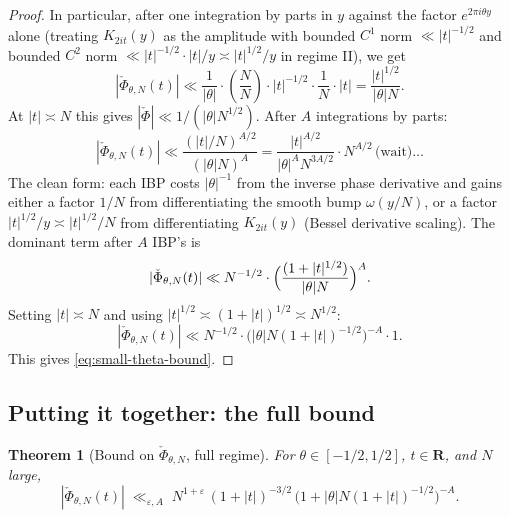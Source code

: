 \documentclass[11pt]{article}
\newtheorem{theorem}{Theorem}[section]
\theoremstyle{definition}
\newcommand{\R}{\mathbf{R}}
\begin{document}
\begin{proof}
In particular, after one integration by parts in $y$ against the factor $e^{2\pi i\theta y}$ alone (treating $K_{2it}(y)$ as the amplitude with bounded $C^1$ norm $\ll |t|^{-1/2}$ and bounded $C^2$ norm $\ll |t|^{-1/2}\cdot|t|/y \asymp |t|^{1/2}/y$ in regime II), we get
\[
    |\check\Phi_{\theta,N}(t)| \ll \frac{1}{|\theta|}\cdot\left(\frac{N}{N}\right)\cdot|t|^{-1/2}\cdot\frac{1}{N} \cdot |t| = \frac{|t|^{1/2}}{|\theta|N}.
\]
At $|t| \asymp N$ this gives $|\check\Phi| \ll 1/(|\theta|N^{1/2})$. After $A$ integrations by parts:
\[
    |\check\Phi_{\theta,N}(t)| \ll \frac{(|t|/N)^{A/2}}{(|\theta|N)^A} = \frac{|t|^{A/2}}{|\theta|^A N^{3A/2}} \cdot N^{A/2}\,\text{(wait)}\ldots
\]
The clean form: each IBP costs $|\theta|^{-1}$ from the inverse phase derivative and gains either a factor $1/N$ from differentiating the smooth bump $\omega(y/N)$, or a factor $|t|^{1/2}/y \asymp |t|^{1/2}/N$ from differentiating $K_{2it}(y)$ (Bessel derivative scaling). The dominant term after $A$ IBP's is
\[
   |\check\Phi_{\theta,N}(t)| \ll N^{-1/2}\cdot\Bigl(\frac{(1+|t|^{1/2})}{|\theta|N}\Bigr)^A.
\]
Setting $|t| \asymp N$ and using $|t|^{1/2} \asymp (1+|t|)^{1/2} \asymp N^{1/2}$:
\[
   |\check\Phi_{\theta,N}(t)| \ll N^{-1/2}\cdot\bigl(|\theta|N(1+|t|)^{-1/2}\bigr)^{-A}\cdot 1.
\]
This gives \eqref{eq:small-theta-bound}.\end{proof}

\subsection{Putting it together: the full bound}\label{ssec:full-bound}

\begin{theorem}[Bound on $\check\Phi_{\theta,N}$, full regime]\label{thm:check-Phi-bound}
For $\theta \in [-1/2,1/2]$, $t \in \R$, and $N$ large,
\begin{equation}\label{eq:final-bound}
    |\check\Phi_{\theta,N}(t)| \;\ll_{\varepsilon,A}\; N^{1+\varepsilon}\,(1+|t|)^{-3/2}\,\bigl(1+|\theta|N(1+|t|)^{-1/2}\bigr)^{-A}.
\end{equation}
\end{theorem}
\end{document}
